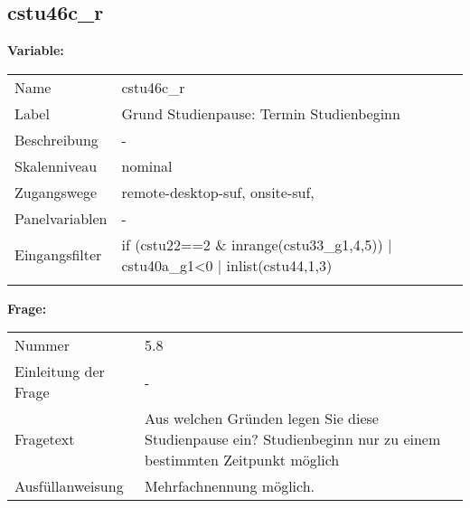 	
	
	\subsection{cstu46c\_r}
	\label{subSection:cstu46c_r}

	\noindent\textbf{Variable:}\\
		\begin{tabular}{lL{11.3cm}}
			\label{tableVariable:cstu46c_r}
			Name & cstu46c\_r \\
			Label & Grund Studienpause: Termin Studienbeginn \\
			Beschreibung & - \\
			Skalenniveau & nominal \\
			Zugangswege &
				remote-desktop-suf,
				onsite-suf,
 \\
			Panelvariablen & -
			 \\
			Eingangsfilter & if (cstu22==2 \& inrange(cstu33\_g1,4,5)) | cstu40a\_g1\textless{}0 | inlist(cstu44,1,3) \\
 \\
		\end{tabular}

		\vspace*{1 cm}
		\noindent\textbf{Frage:}\\
		\begin{tabular}{lL{11.3cm}}
			\label{tableQuestion:cstu46c_r}
			Nummer & 5.8 \\
			Einleitung der Frage & - \\
			Fragetext & Aus welchen Gründen legen Sie diese Studienpause ein?
Studienbeginn nur zu einem bestimmten Zeitpunkt möglich \\
			Ausfüllanweisung & Mehrfachnennung möglich. \\
		\end{tabular}





